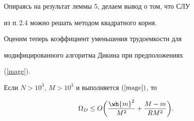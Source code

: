 




Опираясь на результат леммы 5, делаем вывод о том, что СЛУ


из п.\,2.4 можно решать методом квадратного корня.





Оценим теперь коэффициент уменьшения трудоемкости для


модифицированного алгоритма Дикина при предположениях


(\ref{mage}).





\begin{lem}\label{Ol6}


Если $N>10^3$, $M>10^3$ и выполняется $(\ref{mage})$, то


\begin{equation}\label{eq22}


\Omega_D \leq O\bigg(\frac{\wh{m}^2}{M^2} + \frac{M-m}{RM^2}\bigg).


\end{equation}


\end{lem}





